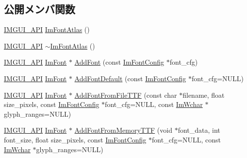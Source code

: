 \subsection*{公開メンバ関数}
\begin{DoxyCompactItemize}
\item 
\mbox{\hyperlink{imgui_8h_a43829975e84e45d1149597467a14bbf5}{I\+M\+G\+U\+I\+\_\+\+A\+PI}} \mbox{\hyperlink{struct_im_font_atlas_aa34e7909d30440d5c35aaef990ac741e}{Im\+Font\+Atlas}} ()
\item 
\mbox{\hyperlink{imgui_8h_a43829975e84e45d1149597467a14bbf5}{I\+M\+G\+U\+I\+\_\+\+A\+PI}} \mbox{\hyperlink{struct_im_font_atlas_a950b4f7586ad7786ae251b957d67a268}{$\sim$\+Im\+Font\+Atlas}} ()
\item 
\mbox{\hyperlink{imgui_8h_a43829975e84e45d1149597467a14bbf5}{I\+M\+G\+U\+I\+\_\+\+A\+PI}} \mbox{\hyperlink{struct_im_font}{Im\+Font}} $\ast$ \mbox{\hyperlink{struct_im_font_atlas_ad01c0f19a95d37a9e5ebab1e54525625}{Add\+Font}} (const \mbox{\hyperlink{struct_im_font_config}{Im\+Font\+Config}} $\ast$font\+\_\+cfg)
\item 
\mbox{\hyperlink{imgui_8h_a43829975e84e45d1149597467a14bbf5}{I\+M\+G\+U\+I\+\_\+\+A\+PI}} \mbox{\hyperlink{struct_im_font}{Im\+Font}} $\ast$ \mbox{\hyperlink{struct_im_font_atlas_a9d2b4a94579bf603a0d2662cd8348cbd}{Add\+Font\+Default}} (const \mbox{\hyperlink{struct_im_font_config}{Im\+Font\+Config}} $\ast$font\+\_\+cfg=N\+U\+LL)
\item 
\mbox{\hyperlink{imgui_8h_a43829975e84e45d1149597467a14bbf5}{I\+M\+G\+U\+I\+\_\+\+A\+PI}} \mbox{\hyperlink{struct_im_font}{Im\+Font}} $\ast$ \mbox{\hyperlink{struct_im_font_atlas_a26d0333bae95222ca2c2fd2886eae562}{Add\+Font\+From\+File\+T\+TF}} (const char $\ast$filename, float size\+\_\+pixels, const \mbox{\hyperlink{struct_im_font_config}{Im\+Font\+Config}} $\ast$font\+\_\+cfg=N\+U\+LL, const \mbox{\hyperlink{imgui_8h_af2c7badaf05a0008e15ef76d40875e97}{Im\+Wchar}} $\ast$glyph\+\_\+ranges=N\+U\+LL)
\item 
\mbox{\hyperlink{imgui_8h_a43829975e84e45d1149597467a14bbf5}{I\+M\+G\+U\+I\+\_\+\+A\+PI}} \mbox{\hyperlink{struct_im_font}{Im\+Font}} $\ast$ \mbox{\hyperlink{struct_im_font_atlas_adb01397920998a18e25bd8fed3f791a7}{Add\+Font\+From\+Memory\+T\+TF}} (void $\ast$font\+\_\+data, int font\+\_\+size, float size\+\_\+pixels, const \mbox{\hyperlink{struct_im_font_config}{Im\+Font\+Config}} $\ast$font\+\_\+cfg=N\+U\+LL, const \mbox{\hyperlink{imgui_8h_af2c7badaf05a0008e15ef76d40875e97}{Im\+Wchar}} $\ast$glyph\+\_\+ranges=N\+U\+LL)
\item 

\end{DoxyCompactItemize}
